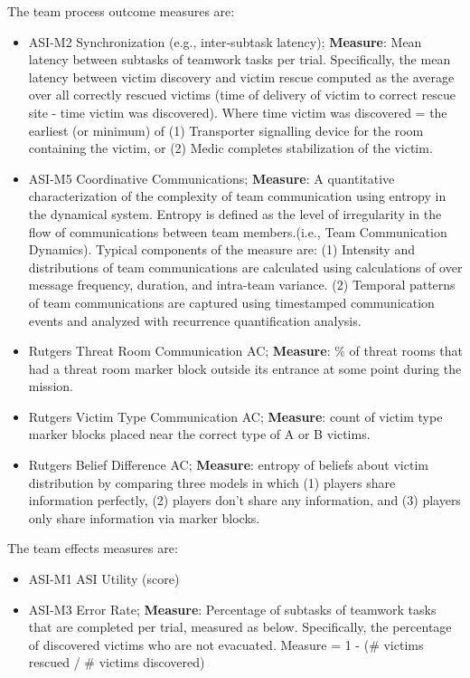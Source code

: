 The team process outcome measures are:
\begin{itemize}
    \item
    ASI-M2 Synchronization (e.g., inter-subtask latency); \textbf{Measure}: Mean latency
    between subtasks of teamwork tasks per trial. Specifically, the mean latency
    between victim discovery and victim rescue computed as the average over all
    correctly rescued victims (time of delivery of victim to correct rescue site
    - time victim was discovered). Where time victim was discovered = the
    earliest (or minimum) of (1) Transporter signalling device for the room
    containing the victim, or (2) Medic completes stabilization of the victim.
 
    \item
    ASI-M5 Coordinative Communications; \textbf{Measure}: A quantitative characterization
    of the complexity of team communication using entropy in the dynamical
    system. Entropy is defined as the level of irregularity in the flow of
    communications between team members.(i.e., Team Communication Dynamics).
    Typical components of the measure are: (1) Intensity and distributions of
    team communications are calculated using calculations of over message
    frequency, duration, and intra-team variance. (2) Temporal patterns of team
    communications are captured using timestamped communication events and
    analyzed with recurrence quantification analysis.

    \item
    Rutgers Threat Room Communication AC; \textbf{Measure}: \% of threat rooms that had a
    threat room marker block outside its entrance at some point during the
    mission.  

    \item
    Rutgers Victim Type Communication AC; \textbf{Measure}: count of victim
    type marker blocks placed near the correct type of A or B victims.
    
    \item
    Rutgers Belief Difference AC; \textbf{Measure}: entropy of beliefs about victim
    distribution by comparing three models in which (1) players share
    information perfectly, (2) players don't share any information, and (3)
    players only share information via marker blocks.  
\end{itemize}

The team effects measures are: 

\begin{itemize}
    \item
    ASI-M1 ASI Utility (score) 
    \item

    ASI-M3 Error Rate; \textbf{Measure}: Percentage of
    subtasks of teamwork tasks that are completed per trial, measured as below.
    Specifically, the percentage of discovered victims who are not evacuated.
    Measure = 1 - (\# victims rescued / \# victims discovered)
\end{itemize}

